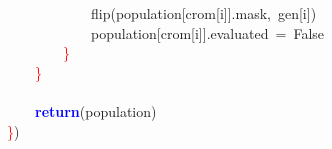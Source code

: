 \mbox{}\ \ \ \ \ \ \ \ \ \ \ \ flip\textcolor{BrickRed}{(}population\textcolor{BrickRed}{[}crom\textcolor{BrickRed}{[}i\textcolor{BrickRed}{]].}mask\textcolor{BrickRed}{,}\ gen\textcolor{BrickRed}{[}i\textcolor{BrickRed}{])} \\
\mbox{}\ \ \ \ \ \ \ \ \ \ \ \ population\textcolor{BrickRed}{[}crom\textcolor{BrickRed}{[}i\textcolor{BrickRed}{]].}evaluated\ \textcolor{BrickRed}{=}\ False \\
\mbox{}\ \ \ \ \ \ \ \ \textcolor{Red}{\}} \\
\mbox{}\ \ \ \ \textcolor{Red}{\}} \\
\mbox{} \\
\mbox{}\ \ \ \ \textbf{\textcolor{Blue}{return}}\textcolor{BrickRed}{(}population\textcolor{BrickRed}{)} \\
\mbox{}\textcolor{Red}{\}}\textcolor{BrickRed}{)} \\
\mbox{}
